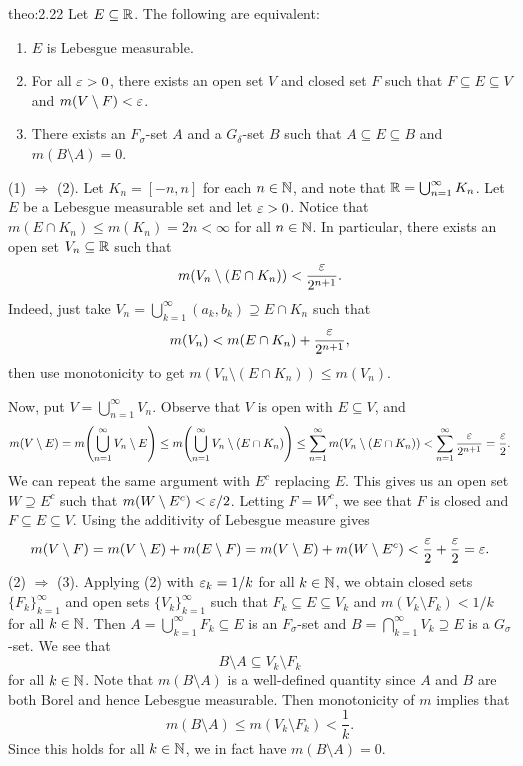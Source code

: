 \begin{theo}{theo:2.22}
    Let $E \subseteq \mathbb{R}$. The following are equivalent: 
    \begin{enumerate}[(1)]
        \item $E$ is Lebesgue measurable. 
        \item For all $\varepsilon > 0$, there exists an open set $V$ and closed 
        set $F$ such that $F \subseteq E \subseteq V$ and 
        $m(V \setminus F) < \varepsilon$. 
        \item There exists an $F_\sigma$-set $A$ and a $G_\delta$-set 
        $B$ such that $A \subseteq E \subseteq B$ and $m(B \setminus A) = 0$. 
    \end{enumerate}
\end{theo}
\begin{pf}
    (1) $\Rightarrow$ (2). Let $K_n = [-n, n]$ for each $n \in \mathbb{N}$, and note that 
    $\mathbb{R} = \bigcup_{n=1}^\infty K_n$. Let $E$ be a Lebesgue measurable set 
    and let $\varepsilon > 0$. Notice that $m(E \cap K_n) \leq m(K_n) = 2n < \infty$ 
    for all $n \in \mathbb{N}$. In particular, there exists an open set $V_n \subseteq \mathbb{R}$ 
    such that 
    \[ m(V_n \setminus (E \cap K_n)) < \frac{\varepsilon}{2^{n+1}}. \] 
    Indeed, just take $V_n = \bigcup_{k=1}^\infty (a_k, b_k) \supseteq 
    E \cap K_n$ such that 
    \[ m(V_n) < m(E \cap K_n) + \frac{\varepsilon}{2^{n+1}}, \] 
    then use monotonicity to get $m(V_n \setminus (E \cap K_n)) \leq m(V_n)$.

    Now, put $V = \bigcup_{n=1}^\infty V_n$. Observe that $V$ is open with 
    $E \subseteq V$, and 
    \[ m(V \setminus E) = m\!\left( \bigcup_{n=1}^\infty V_n \setminus E \right) 
    \leq m\!\left( \bigcup_{n=1}^\infty V_n \setminus (E \cap K_n) \right) 
    \leq \sum_{n=1}^\infty m(V_n \setminus (E \cap K_n)) 
    < \sum_{n=1}^\infty \frac{\varepsilon}{2^{n+1}} = \frac{\varepsilon}{2}. \] 
    We can repeat the same argument with $E^c$ replacing $E$. This gives us 
    an open set $W \supseteq E^c$ such that $m(W \setminus E^c) < \varepsilon/2$. 
    Letting $F = W^c$, we see that $F$ is closed and $F \subseteq E \subseteq V$. 
    Using the additivity of Lebesgue measure gives 
    \[ m(V \setminus F) = m(V \setminus E) + m(E \setminus F) 
    = m(V \setminus E) + m(W \setminus E^c) < \frac{\varepsilon}{2} + \frac{\varepsilon}{2} 
    = \varepsilon. \] 
    (2) $\Rightarrow$ (3). Applying (2) with $\varepsilon_k = 1/k$ for all $k \in \mathbb{N}$, 
    we obtain closed sets $\{F_k\}_{k=1}^\infty$ and open sets $\{V_k\}_{k=1}^\infty$ 
    such that $F_k \subseteq E \subseteq V_k$ and $m(V_k \setminus F_k) 
    < 1/k$ for all $k \in \mathbb{N}$. Then $A = \bigcup_{k=1}^\infty F_k \subseteq E$ 
    is an $F_\sigma$-set and $B = \bigcap_{k=1}^\infty V_k \supseteq E$ is a 
    $G_\sigma$-set. We see that 
    \[ B \setminus A \subseteq V_k \setminus F_k \] 
    for all $k \in \mathbb{N}$. Note that $m(B \setminus A)$ is a well-defined quantity
    since $A$ and $B$ are both Borel and hence Lebesgue measurable. Then 
    monotonicity of $m$ implies that 
    \[ m(B \setminus A) \leq m(V_k \setminus F_k) < \frac1k. \] 
    Since this holds for all $k \in \mathbb{N}$, we in fact have $m(B \setminus A) = 0$. 


\end{pf}
